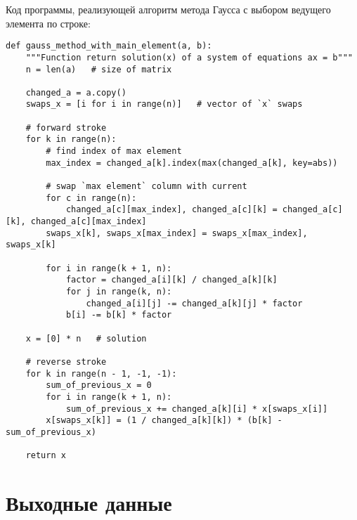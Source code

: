 \documentclass[12pt]{report}
\begin{document}
Код программы, реализующей алгоритм метода Гаусса с выбором ведущего элемента по строке: 

\begin{lstlisting}
def gauss_method_with_main_element(a, b):
    """Function return solution(x) of a system of equations ax = b"""
    n = len(a)   # size of matrix
    
    changed_a = a.copy()
    swaps_x = [i for i in range(n)]   # vector of `x` swaps

    # forward stroke
    for k in range(n):
        # find index of max element 
        max_index = changed_a[k].index(max(changed_a[k], key=abs))
        
        # swap `max element` column with current
        for c in range(n):
            changed_a[c][max_index], changed_a[c][k] = changed_a[c][k], changed_a[c][max_index]
        swaps_x[k], swaps_x[max_index] = swaps_x[max_index], swaps_x[k]

        for i in range(k + 1, n):
            factor = changed_a[i][k] / changed_a[k][k]
            for j in range(k, n):
                changed_a[i][j] -= changed_a[k][j] * factor
            b[i] -= b[k] * factor

    x = [0] * n   # solution
    
    # reverse stroke
    for k in range(n - 1, -1, -1):
        sum_of_previous_x = 0
        for i in range(k + 1, n):
            sum_of_previous_x += changed_a[k][i] * x[swaps_x[i]]
        x[swaps_x[k]] = (1 / changed_a[k][k]) * (b[k] - sum_of_previous_x)

    return x
\end{lstlisting}

\section{Выходные данные}
\end{document}
